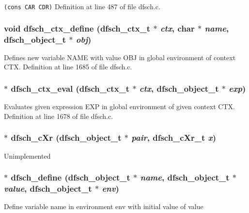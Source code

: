 {\tt (cons CAR CDR)} Definition at line 487 of file dfsch.c.
\subsubsection{\setlength{\rightskip}{0pt plus 5cm}void dfsch\_\-ctx\_\-define ({\bf dfsch\_\-ctx\_\-t} $\ast$ {\em ctx}, char $\ast$ {\em name}, {\bf dfsch\_\-object\_\-t} $\ast$ {\em obj})}\label{dfsch_8h_a49}


Defines new variable NAME with value OBJ in global environment of context CTX. Definition at line 1685 of file dfsch.c.
\subsubsection{$\ast$ dfsch\_\-ctx\_\-eval ({\bf dfsch\_\-ctx\_\-t} $\ast$ {\em ctx}, {\bf dfsch\_\-object\_\-t} $\ast$ {\em exp})}\label{dfsch_8h_a47}


Evaluates given expression EXP in global environment of given context CTX. Definition at line 1678 of file dfsch.c.
\subsubsection{$\ast$ dfsch\_\-c\-Xr ({\bf dfsch\_\-object\_\-t} $\ast$ {\em pair}, {\bf dfsch\_\-c\-Xr\_\-t} {\em x})}\label{dfsch_8h_a27}


Unimplemented 
\subsubsection{$\ast$ dfsch\_\-define ({\bf dfsch\_\-object\_\-t} $\ast$ {\em name}, {\bf dfsch\_\-object\_\-t} $\ast$ {\em value}, {\bf dfsch\_\-object\_\-t} $\ast$ {\em env})}\label{dfsch_8h_a43}


Define variable name in environment env with initial value of value 

